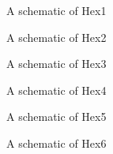 \documentclass[parskip=half]{scrarticle}
\begin{document}
\begin{enumerate}
\begin{figure}[ht!]
    \centering
    \caption{A schematic of Hex1}
    \label{f:part2_hex1}
\end{figure}

\begin{figure}[ht!]
    \centering
    \caption{A schematic of Hex2}
    \label{f:part2_hex2}
\end{figure}

\begin{figure}[ht!]
    \centering
    \caption{A schematic of Hex3}
    \label{f:part2_hex3}
\end{figure}

\begin{figure}[ht!]
    \centering
    \caption{A schematic of Hex4}
    \label{f:part2_hex4}
\end{figure}

\begin{figure}[ht!]
    \centering
    \caption{A schematic of Hex5}
    \label{f:part2_hex5}
\end{figure}

\begin{figure}[ht!]
    \centering
    \caption{A schematic of Hex6}
    \label{f:part2_hex6}
\end{figure}
\end{enumerate}
\end{document}
